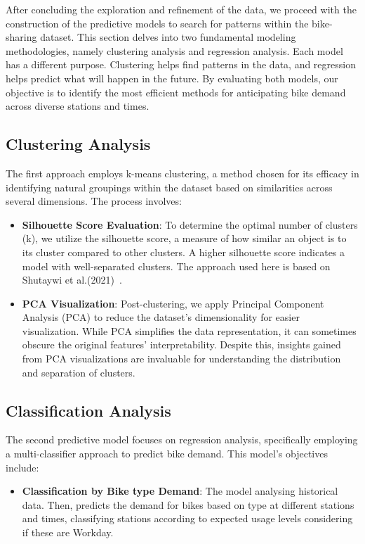 After concluding the exploration and refinement of the data, we proceed with the construction of the predictive models to search for patterns within the bike-sharing dataset.
This section delves into two fundamental modeling methodologies, namely clustering analysis and regression analysis.
Each model has a different purpose.
Clustering helps find patterns in the data, and regression helps predict what will happen in the future.
By evaluating both models, our objective is to identify the most efficient methods for anticipating bike demand across diverse stations and times.

\subsection{Clustering Analysis}\label{subsec:clustering-analysis}


The first approach employs k-means clustering, a method chosen for its efficacy in identifying natural groupings within the dataset based on similarities across several dimensions.
The process involves:

\begin{itemize}
    \item \textbf{Silhouette Score Evaluation}: To determine the optimal number of clusters (k), we utilize the silhouette score, a measure of how similar an object is to its cluster compared to other clusters.
    A higher silhouette score indicates a model with well-separated clusters. The approach used here is based on Shutaywi et al.(2021)~\cite{e23060759}.
    \item \textbf{PCA Visualization}: Post-clustering, we apply Principal Component Analysis (PCA) to reduce the dataset's dimensionality for easier visualization.
    While PCA simplifies the data representation, it can sometimes obscure the original features' interpretability.
    Despite this, insights gained from PCA visualizations are invaluable for understanding the distribution and separation of clusters.
\end{itemize}

\subsection{Classification Analysis}\label{subsec:classification-analysis}
    The second predictive model focuses on regression analysis, specifically employing a multi-classifier approach to predict bike demand.
    This model's objectives include:
\begin{itemize}
    \item \textbf{Classification by Bike type Demand}: The model analysing historical data.
    Then, predicts the demand for bikes based on type at different stations and times, classifying stations according to expected usage levels considering if these are Workday.
\end{itemize}

